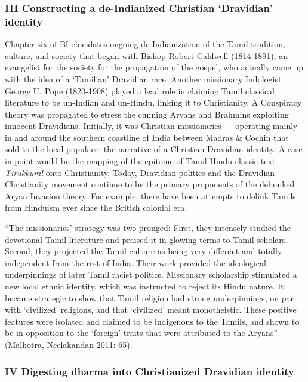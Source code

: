 \subsubsection*{III Constructing a de-Indianized Christian ‘Dravidian’ identity }

Chapter six of BI elucidates ongoing de-Indianization of the Tamil tradition, culture, and society that began with Bishop Robert Caldwell (1814-1891), an evangelist for the society for the propagation of the gospel, who actually came up with the idea of a ‘Tamilian’ Dravidian race. Another missionary Indologist George U. Pope (1820-1908) played a lead role in claiming Tamil classical literature to be un-Indian and un-Hindu, linking it to Christianity. A Conspiracy theory was propagated to stress the cunning Aryans and Brahmins exploiting innocent Dravidians. Initially, it was Christian missionaries — operating mainly in and around the southern coastline of India between Madras \& Cochin that sold to the local populace, the narrative of a Christian Dravidian identity. A case in point would be the mapping of the epitome of Tamil-Hindu classic text \textit{Tirukkural} onto Christianity. Today, Dravidian politics and the Dravidian Christianity movement continue to be the primary proponents of the debunked Aryan Invasion theory. For example, there have been attempts to delink Tamils from Hinduism ever since the British colonial era.

\begin{myquote}
“The missionaries’ strategy was two-pronged: First, they intensely studied the devotional Tamil literature and praised it in glowing terms to Tamil scholars. Second, they projected the Tamil culture as being very different and totally independent from the rest of India. Their work provided the ideological underpinnings of later Tamil racist politics. Missionary scholarship stimulated a new local ethnic identity, which was instructed to reject its Hindu nature. It became strategic to show that Tamil religion had strong underpinnings, on par with ‘civilized’ religions, and that ‘civilized’ meant monotheistic. These positive features were isolated and claimed to be indigenous to the Tamils, and shown to be in opposition to the ‘foreign’ traits that were attributed to the Aryans” (Malhotra, Neelakandan 2011: 65).
\end{myquote}


\subsubsection*{IV Digesting dharma into Christianized Dravidian identity}


